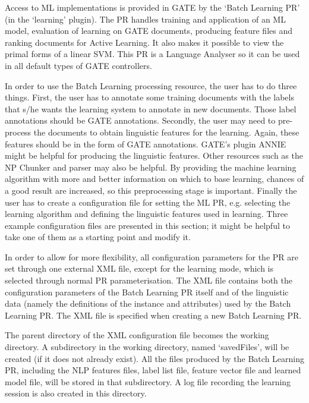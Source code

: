 Access to ML implementations is provided in GATE by the `Batch Learning PR' (in
the `learning' plugin). The PR handles training and application of an ML model,
evaluation of learning on GATE documents, producing feature files and
ranking documents for Active Learning. It also makes it possible to view the
primal forms of a linear SVM. This PR is a Language Analyser so it can be used in
all default types of GATE controllers.

In order to use the Batch Learning processing resource, the user has to do
three things. First, the user has to annotate some training documents with the
labels that s/he wants the learning system to annotate in new documents. Those
label annotations should be GATE annotations. Secondly, the user may need to
pre-process the documents to obtain linguistic features for the learning.
Again, these features should be in the form of GATE annotations. GATE's plugin
ANNIE might be helpful for producing the linguistic features. Other resources
such as the NP Chunker and parser may also be helpful. By providing the
machine learning algorithm with more and better information on which to base
learning, chances of a good result are increased, so this preprocessing
stage is important. Finally the user has to create a configuration file for
setting the ML PR, e.g.  selecting the learning algorithm and defining the
linguistic features used in learning. Three example configuration files are
presented in this section; it might be helpful to take one of them as a
starting point and modify it.


In order to allow for more flexibility, all configuration parameters for the
PR are set through one external XML file, except for the learning mode, which
is selected through normal PR parameterisation. The XML file contains both the
configuration parameters of the Batch Learning PR itself and of the linguistic
data (namely the definitions of the instance and attributes) used by the Batch
Learning PR. The XML file is specified when creating a new Batch Learning PR.

The parent directory of the XML configuration file becomes the working directory.
A subdirectory in the working directory, named `savedFiles', will be created
(if it does not already exist). All the files produced by the Batch Learning PR,
including the NLP features files, label list file, feature vector file and
learned model file, will be stored in that subdirectory. A log file recording the
learning session is also created in this directory.

